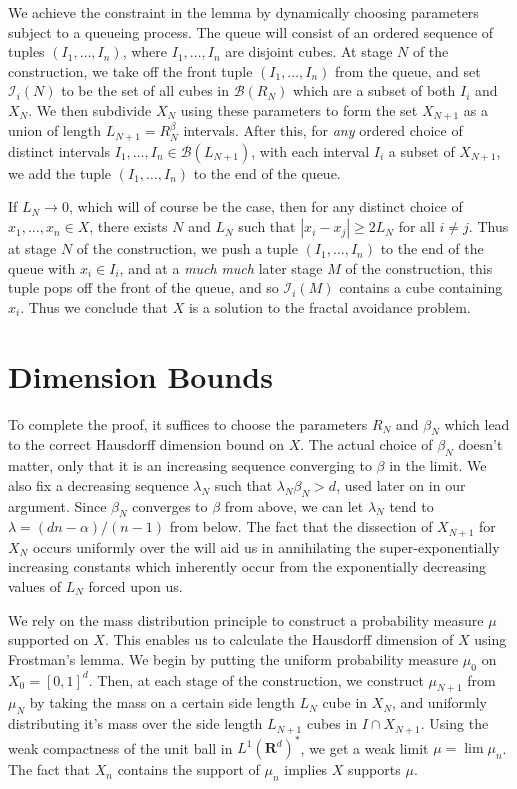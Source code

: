 \documentclass{article}
\theoremstyle{plain}
\theoremstyle{plain}
\begin{document}
\begin{multicols}{2}

We achieve the constraint in the lemma by dynamically choosing parameters subject to a queueing process. The queue will consist of an ordered sequence of tuples $(I_1, \dots, I_n)$, where $I_1 ,\dots, I_n$ are disjoint cubes. At stage $N$ of the construction, we take off the front tuple $(I_1, \dots, I_n)$ from the queue, and set $\mathcal{I}_i(N)$ to be the set of all cubes in $\mathcal{B}(R_N)$ which are a subset of both $I_i$ and $X_N$. We then subdivide $X_N$ using these parameters to form the set $X_{N+1}$ as a union of length $L_{N+1} = R_N^\beta$ intervals. After this, for {\it any} ordered choice of distinct intervals $I_1, \dots, I_n \in \mathcal{B}(L_{N+1})$, with each interval $I_i$ a subset of $X_{N+1}$, we add the tuple $(I_1, \dots, I_n)$ to the end of the queue.

If $L_N \to 0$, which will of course be the case, then for any distinct choice of $x_1, \dots, x_n \in X$, there exists $N$ and $L_N$ such that $|x_i - x_j| \geq 2 L_N$ for all $i \neq j$. Thus at stage $N$ of the construction, we push a tuple $(I_1, \dots, I_n)$ to the end of the queue with $x_i \in I_i$, and at a {\it much} {\it much} later stage $M$ of the construction, this tuple pops off the front of the queue, and so $\mathcal{I}_i(M)$ contains a cube containing $x_i$. Thus we conclude that $X$ is a solution to the fractal avoidance problem.

\section{Dimension Bounds}

To complete the proof, it suffices to choose the parameters $R_N$ and $\beta_N$ which lead to the correct Hausdorff dimension bound on $X$. The actual choice of $\beta_N$ doesn't matter, only that it is an increasing sequence converging to $\beta$ in the limit. We also fix a decreasing sequence $\lambda_N$ such that $\lambda_N \beta_N > d$, used later on in our argument. Since $\beta_N$ converges to $\beta$ from above, we can let $\lambda_N$ tend to $\lambda = (dn - \alpha)/(n - 1)$ from below. The fact that the dissection of $X_{N+1}$ for $X_N$ occurs uniformly over the will aid us in annihilating the super-exponentially increasing constants which inherently occur from the exponentially decreasing values of $L_N$ forced upon us.

We rely on the mass distribution principle to construct a probability measure $\mu$ supported on $X$. This enables us to calculate the Hausdorff dimension of $X$ using Frostman's lemma. We begin by putting the uniform probability measure $\mu_0$ on $X_0 = [0,1]^d$. Then, at each stage of the construction, we construct $\mu_{N+1}$ from $\mu_N$ by taking the mass on a certain side length $L_N$ cube in $X_N$, and uniformly distributing it's mass over the side length $L_{N+1}$ cubes in $I \cap X_{N+1}$. Using the weak compactness of the unit ball in $L^1(\mathbf{R}^d)^*$, we get a weak limit $\mu = \lim \mu_n$. The fact that $X_n$ contains the support of $\mu_n$ implies $X$ supports $\mu$.


\end{multicols}
\end{document}

